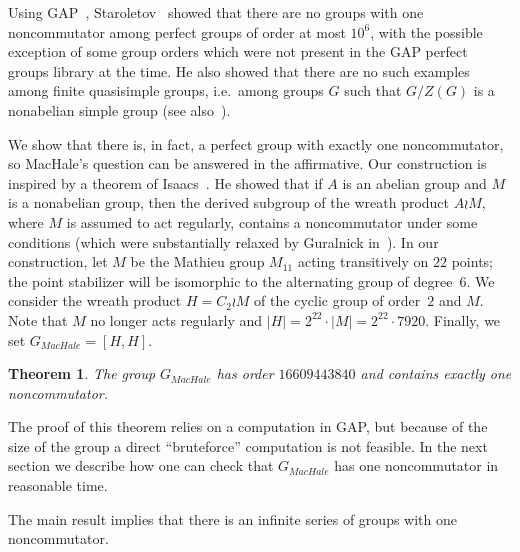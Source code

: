 \documentclass{article}
\newtheorem*{theorem}{Theorem}
\begin{document}
Using GAP~\cite{gap}, Staroletov~\cite{staroletov} showed that there are no groups with one noncommutator among perfect groups of order at most \( 10^6 \),
with the possible exception of some group orders which were not present in the GAP perfect groups library at the time.
He also showed that there are no such examples among finite quasisimple groups,
i.e.\ among groups \( G \) such that \( G/Z(G) \) is a nonabelian simple group (see also~\cite[Table~1]{liebeck}).

We show that there is, in fact, a perfect group with exactly one noncommutator, so MacHale's question can be answered in the affirmative.
Our construction is inspired by a theorem of Isaacs~\cite{isaacs}.
He showed that if \( A \) is an abelian group and \( M \) is a nonabelian group, then the derived subgroup of the wreath product \( A \wr M \),
where \( M \) is assumed to act regularly, contains a noncommutator under some conditions (which were substantially relaxed by Guralnick in~\cite{gural2}).
In our construction, let \( M \) be the Mathieu group \( M_{11} \) acting transitively on \( 22 \) points; the point stabilizer
will be isomorphic to the alternating group of degree~\( 6 \). We consider the wreath product \( H = C_2 \wr M \) of the cyclic group of order~\( 2 \)
and \( M \). Note that \( M \) no longer acts regularly and \( |H| = 2^{22} \cdot |M| = 2^{22} \cdot 7920 \). Finally, we set \( G_{MacHale} = [H, H] \).

\begin{theorem}
	The group \( G_{MacHale} \) has order \( 16609443840 \) and contains exactly one noncommutator.
\end{theorem}

The proof of this theorem relies on a computation in GAP, but because of the size of the group a direct ``bruteforce'' computation is not feasible.
In the next section we describe how one can check that \( G_{MacHale} \) has one noncommutator in reasonable time.

The main result implies that there is an infinite series of groups with one noncommutator.
\end{document}
